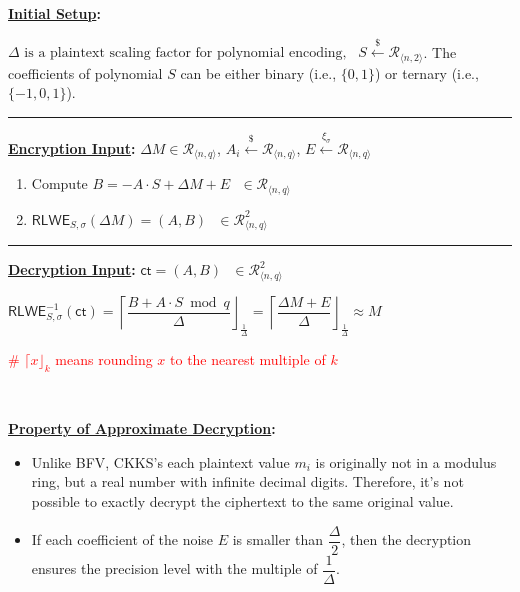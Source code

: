 \begin{tcolorbox}[title={\textbf{\tboxlabel{\ref*{subsec:ckks-enc-dec}} CKKS Encryption and Decryption}}]

\textbf{\underline{Initial Setup}:} 

$\Delta \text{ is a plaintext scaling factor for polynomial encoding}, \text{ } S \xleftarrow{\$} \mathcal{R}_{\langle n, 2 \rangle}$. The coefficients of polynomial $S$ can be either binary (i.e., $\{0, 1\}$) or ternary (i.e., $\{-1, 0, 1\}$).

\par\noindent\rule{\textwidth}{0.4pt}

\textbf{\underline{Encryption Input}:} $\Delta M \in \mathcal{R}_{\langle n, q \rangle}$, $A_i \xleftarrow{\$} \mathcal{R}_{\langle n, q \rangle}$, $E \xleftarrow{\xi_\sigma} \mathcal{R}_{\langle n, q \rangle}$


\begin{enumerate}

\item Compute $B = -A \cdot S + \Delta M + E \text{ } \in \mathcal{R}_{\langle n,q \rangle}$

\item $\textsf{RLWE}_{S,\sigma}(\Delta M) = (A, B) \text{ } \in \mathcal{R}_{\langle n,q \rangle}^2$ 

\end{enumerate}

\par\noindent\rule{\textwidth}{0.4pt}

\textbf{\underline{Decryption Input}:} $\textsf{ct} = (A, B) \text{ } \in \mathcal{R}_{\langle n,q \rangle}^2$

$\textsf{RLWE}^{-1}_{S,\sigma}(\textsf{ct}) = \left\lceil\dfrac{B + A \cdot S \bmod q}{\Delta}\right\rfloor_{\frac{1}{\Delta}} = \left\lceil\dfrac{\Delta M + E}{\Delta}\right\rfloor_{\frac{1}{\Delta}} \approx M$

\textcolor{red}{\# $\lceil x\rfloor_{k}$ means rounding $x$ to the nearest multiple of $k$}



$ $

\textbf{\underline{Property of Approximate Decryption}:}
\begin{itemize}
\item Unlike BFV, CKKS's each plaintext value $m_i$ is originally not in a modulus ring, but a real number with infinite decimal digits. Therefore, it's not possible to exactly decrypt the ciphertext to the same original value.
\item If each coefficient of the noise $E$ is smaller than $\dfrac{\Delta}{2}$, then the decryption ensures the precision level with the multiple of $\dfrac{1}{\Delta}$.  
\end{itemize}

\end{tcolorbox}



